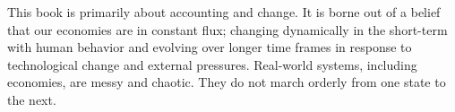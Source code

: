 
This book is primarily about accounting and change.
It is borne out of a belief that our economies are in constant flux;
changing dynamically in the short-term with human behavior
and evolving over longer time frames 
in response to technological change and
external pressures.
Real-world systems, including economies, are messy and chaotic.
They do not march orderly from one state to the next.

% 
%



